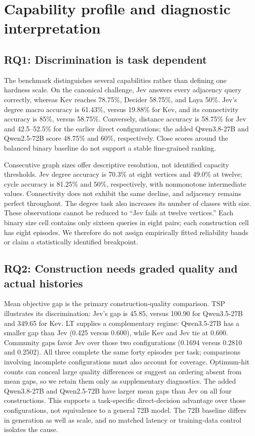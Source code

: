 \section{Capability profile and diagnostic interpretation}
\label{sec:capability}
\subsection{RQ1: Discrimination is task dependent}
The benchmark distinguishes several capabilities rather than defining one
hardness scale. On the canonical challenge, Jev answers every adjacency
query correctly, whereas Kev reaches 78.75\%, Decider 58.75\%, and Laya 50\%.
Jev's degree macro accuracy is 61.43\%, versus 19.88\% for Kev, and its
connectivity accuracy is 85\%, versus 58.75\%.
Conversely, distance accuracy is 58.75\% for Jev and 42.5--52.5\% for the
earlier direct configurations; the added Qwen3.8-27B and Qwen2.5-72B
score 48.75\% and 60\%, respectively. Close scores around the balanced binary
baseline do not support a stable fine-grained ranking.

Consecutive graph sizes offer descriptive resolution, not identified
capacity thresholds. Jev degree accuracy is 70.3\% at eight vertices and
49.0\% at twelve; cycle accuracy is 81.25\% and 50\%, respectively, with
nonmonotone intermediate values. Connectivity does not exhibit the same
decline, and adjacency remains perfect throughout. The degree task also
increases its number of classes with size. These observations cannot be
reduced to ``Jev fails at twelve vertices.'' Each binary size cell contains
only sixteen queries in eight pairs; each construction cell has eight
episodes. We therefore do not assign empirically fitted reliability bands
or claim a statistically identified breakpoint.

\subsection{RQ2: Construction needs graded quality and actual histories}
Mean objective gap is the primary construction-quality comparison.
TSP illustrates its discrimination: Jev's gap is 45.85, versus 100.90
for Qwen3.5-27B and 349.65 for Kev. LT supplies a complementary regime:
Qwen3.5-27B has a smaller gap than Jev (0.425 versus 0.600), while Kev and
Jev tie at 0.600. Community gaps favor Jev over those two configurations
(0.1694 versus 0.2810 and 0.2502). All three complete the same forty
episodes per task; comparisons involving incomplete configurations must
also account for coverage. Optimum-hit counts can conceal large quality
differences or suggest an ordering absent from mean gaps, so we retain
them only as supplementary diagnostics.
The added Qwen3.8-27B and Qwen2.5-72B have larger mean gaps than Jev on
all four constructions. This supports a task-specific direct-decision
advantage over those configurations, not equivalence to a general 72B model.
The 72B baseline differs in generation as well as scale, and no matched
latency or training-data control isolates the cause.

